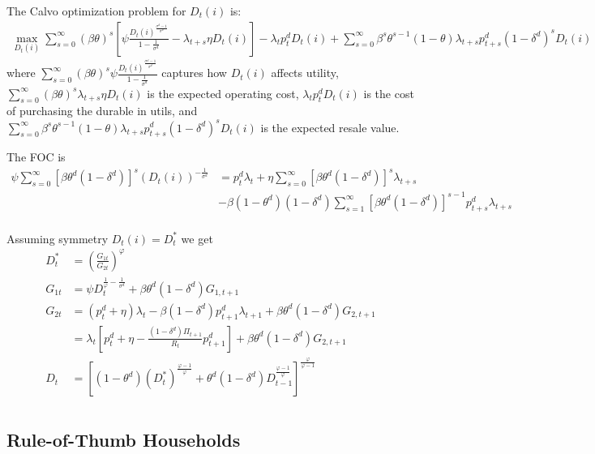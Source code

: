 \documentclass[11pt]{article}
\begin{document}
The Calvo optimization problem for $D_{t}(i)$ is:
\begin{align*}
	\max_{D_t(i)}\sum_{s=0}^{\infty}(\beta\theta)^s\left[\psi \frac{ D_t(i)^{\frac{\sigma^d-1}{\sigma^d}}}{1-\frac{1}{\sigma^d}} - \lambda_{t+s}\eta D_t(i) \right] - \lambda_t p_t^d D_t(i) + \sum_{s=0}^{\infty}\beta^s\theta^{s-1}(1-\theta) \lambda_{t+s} p_{t+s}^d (1-\delta^d)^s D_{t}(i)
\end{align*}
where $\sum_{s=0}^{\infty}(\beta\theta)^s\psi \frac{ D_t(i)^{\frac{\sigma^d-1}{\sigma^d}}}{1-\frac{1}{\sigma^d}}$ captures how $D_t(i)$ affects utility, $\sum_{s=0}^{\infty}(\beta\theta)^s \lambda_{t+s}\eta D_t(i) $ is the expected operating cost, $\lambda_t p_t^d D_t(i)$ is the cost of purchasing the durable in utils, 
and $\sum_{s=0}^{\infty}\beta^s\theta^{s-1}(1-\theta) \lambda_{t+s} p_{t+s}^d (1-\delta^d)^s D_{t}(i)$ is the expected resale value.

The FOC is
\begin{align*}
	\psi\sum_{s=0}^{\infty}[\beta\theta^d(1-\delta^d)]^s (D_t(i))^{-\frac{1}{\sigma^d}} &=p_t^d\lambda_t + \eta \sum_{s=0}^{\infty}[\beta\theta^d(1-\delta^d)]^s \lambda_{t+s} \\
	& - \beta(1-\theta^d)(1-\delta^d)\sum_{s=1}^{\infty}[\beta\theta^d(1-\delta^d)]^{s-1} p_{t+s}^d\lambda_{t+s} \\
\end{align*}


Assuming symmetry $D_t(i)=D_t^*$ we get
\begin{align*}
	D_t^* &= \left(\frac{G_{1t}}{G_{2t}}\right)^{\varphi} \\
	G_{1t} &= \psi D_t^{\frac{1}{\varphi}-\frac{1}{\sigma^d}} + \beta\theta^d(1-\delta^d)G_{1,t+1} \\
	G_{2t} &= (p_t^d+\eta)\lambda_t - \beta(1-\delta^d)p_{t+1}^d\lambda_{t+1} + \beta\theta^d(1-\delta^d)G_{2,t+1} \\
	&=\lambda_t\left[p_t^d + \eta - \frac{(1-\delta^d)\Pi_{t+1}}{R_t}p_{t+1}^d\right] + \beta\theta^d(1-\delta^d)G_{2,t+1} \\
	D_t &=   \left[(1-\theta^d)(D_{t}^*)^{\frac{\varphi-1}{\varphi}} + \theta^d (1-\delta^d)D_{t-1}^{\frac{\varphi-1}{\varphi}}\right]^{\frac{\varphi}{\varphi-1}} \\
\end{align*}

\subsection{Rule-of-Thumb Households}
\end{document}
